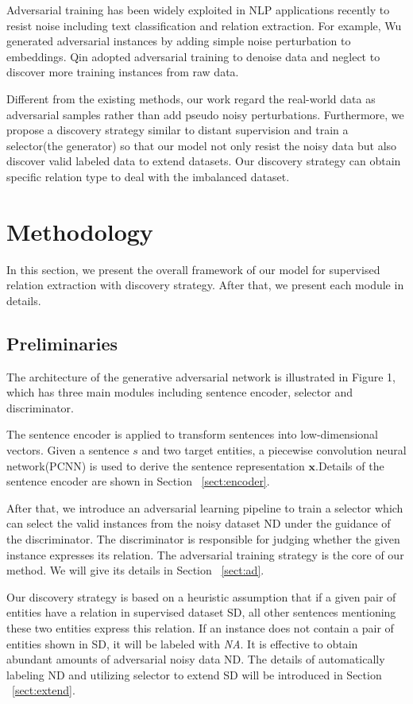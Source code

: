 \documentclass[conference]{IEEEtran}
\begin{document}
Adversarial training has been widely exploited in NLP applications recently to resist noise including text classification and relation extraction\cite{miyato2016adversarial, wu2017adversarial, qin2018dsgan}.
For example, Wu\cite{wu2017adversarial} generated adversarial instances by adding simple noise perturbation to embeddings.
Qin\cite{qin2018dsgan} adopted adversarial training to denoise data and neglect to discover more training instances from raw data.

Different from the existing methods, our work regard the real-world data as adversarial samples rather than add pseudo noisy perturbations.
Furthermore, we propose a discovery strategy similar to distant supervision and train a selector(the generator) so that our model not only resist the noisy data but also discover valid labeled data to extend datasets.
Our discovery strategy can obtain specific relation type to deal with the imbalanced dataset.

\section{Methodology}
In this section, we present the overall framework of our model for supervised relation extraction with discovery strategy.
After that, we present each module in details.
\subsection{Preliminaries}
The architecture of the generative adversarial network is illustrated in Figure 1, which has three main modules including sentence encoder, selector and discriminator.

The sentence encoder is applied to transform sentences into low-dimensional vectors.
Given a sentence $s$ and two target entities, a piecewise convolution neural network(PCNN)\cite{zeng2015distant} is used to derive the sentence representation $\mathbf{x}$.Details of the sentence encoder are shown in Section ~\ref{sect:encoder}.

After that, we introduce an adversarial learning pipeline to train a selector which can select the valid instances from the noisy dataset ND under the guidance of the discriminator.
The discriminator is responsible for judging whether the given instance expresses its relation. 
The adversarial training strategy is the core of our method.
We will give its details in Section ~\ref{sect:ad}.

Our discovery strategy is based on a heuristic assumption that if a given pair of entities have a relation in supervised dataset SD, all other sentences mentioning these two entities express this relation.
If an instance does not contain a pair of entities shown in SD, it will be labeled with \textit{NA}.
It is effective to obtain abundant amounts of adversarial noisy data ND.
The details of automatically labeling ND and utilizing selector to extend SD will be introduced in Section ~\ref{sect:extend}. 
\end{document}
